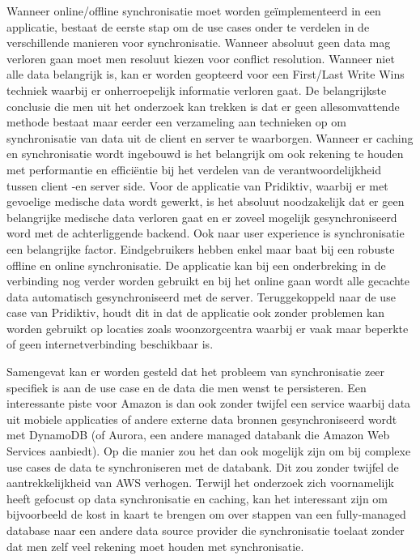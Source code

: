 Wanneer online/offline synchronisatie moet worden ge\"implementeerd in een applicatie,  bestaat de eerste stap om de use cases onder te verdelen in de verschillende manieren voor synchronisatie. Wanneer absoluut geen data mag verloren gaan moet men resoluut kiezen voor conflict resolution. Wanneer niet alle data belangrijk is, kan er worden geopteerd voor een First/Last Write Wins techniek waarbij er onherroepelijk informatie verloren gaat. De belangrijkste conclusie die men uit het onderzoek kan trekken is dat er geen allesomvattende methode bestaat maar eerder een verzameling aan technieken op om synchronisatie van data uit de client en server te waarborgen. Wanneer er caching en synchronisatie wordt ingebouwd is het belangrijk om ook rekening te houden met performantie en effici\"entie bij het verdelen van de verantwoordelijkheid tussen client -en server side. Voor de applicatie van Pridiktiv, waarbij er met gevoelige medische data wordt gewerkt, is het absoluut noodzakelijk dat er geen belangrijke medische data verloren gaat en er zoveel mogelijk gesynchroniseerd word met de achterliggende backend. Ook naar user experience is synchronisatie een belangrijke factor. Eindgebruikers hebben enkel maar baat bij een robuste offline en online synchronisatie. 
\clearpage
De applicatie kan bij een onderbreking in de verbinding nog verder worden gebruikt en bij het online gaan wordt alle gecachte data automatisch gesynchroniseerd met de server. Teruggekoppeld naar de use case van Pridiktiv, houdt dit in dat de applicatie ook zonder problemen kan worden gebruikt op locaties zoals woonzorgcentra waarbij er vaak maar beperkte of geen internetverbinding beschikbaar is.

Samengevat kan er worden gesteld dat het probleem van synchronisatie zeer specifiek is aan de use case en de data  die men wenst te persisteren. Een interessante piste voor Amazon is dan ook zonder twijfel een service waarbij data uit mobiele applicaties of andere externe data bronnen gesynchroniseerd wordt met DynamoDB (of Aurora, een andere managed databank die Amazon Web Services aanbiedt). Op die manier zou het dan ook mogelijk zijn om bij complexe use cases de data te synchroniseren met de databank. Dit zou zonder twijfel de aantrekkelijkheid van AWS verhogen. Terwijl het onderzoek zich voornamelijk heeft gefocust op data synchronisatie en caching, kan het interessant zijn om bijvoorbeeld de kost in kaart te brengen om over stappen van een fully-managed database naar een andere data source provider die synchronisatie toelaat zonder dat men zelf veel rekening moet houden met synchronisatie.